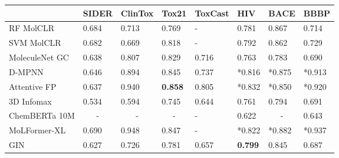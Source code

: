 \documentclass{article} %
\begin{document}
\begin{table}[]
\vspace{-3em}
\centering
\scriptsize
\begin{tabular}{llllllll}
\toprule
              & \multicolumn{1}{l}{SIDER} & \multicolumn{1}{l}{ClinTox} & \multicolumn{1}{l}{Tox21} & \multicolumn{1}{l}{ToxCast}        & \multicolumn{1}{l}{HIV}                   & \multicolumn{1}{l}{BACE}                  & \multicolumn{1}{l}{BBBP}                \\
\midrule
RF MolCLR           & 0.684                     & 0.713                       & 0.769                     & -                                  & 0.781                 & 0.867                 & 0.714                 \\
SVM  MolCLR         & 0.682                     & 0.669                       & 0.818                     & -                                  & 0.792                 & 0.862                 & 0.729                 \\ \midrule
MoleculeNet GC      & 0.638 & 0.807     & 0.829     &   0.716     &   0.763   & 0.783   & 0.690  \\
D-MPNN        & 0.646                     & 0.894                 & 0.845                           & 0.737                              & *0.816                 & *0.875                 & *0.913                 \\
Attentive FP  & 0.637                     & 0.940                        & \textbf{0.858}            & 0.805          & *0.832            & *0.850                 & *0.920              \\
3D Infomax    & 0.534                     & 0.594                        & 0.745                    & 0.644          & 0.761             & 0.794                  & 0.691              \\ \midrule
ChemBERTa 10M & \multicolumn{1}{c}{-}     & \multicolumn{1}{c}{-}       & \multicolumn{1}{c}{-}     & -                                  & 0.622                 & \multicolumn{1}{c}{-} & 0.643                 \\
MoLFormer-XL  & 0.690                     & 0.948                       &  0.847  & -                                  & *0.822                & *0.882                 & *0.937                 \\
GIN           & 0.627                     & 0.726                       & 0.781                     &  0.657                                   & \textbf{0.799}         & 0.845                 & 0.687                 \\

\end{tabular}
\end{table}
\end{document}
